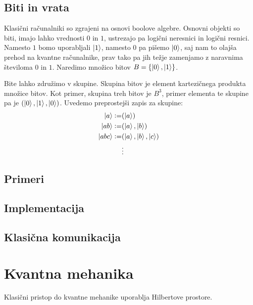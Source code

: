 \documentclass[mat1]{fmfdelo}
\newcommand{\defeq}{\vcentcolon=}
\begin{document}
\subsection{Biti in vrata}
Klasični računalniki so zgrajeni na osnovi boolove algebre. Osnovni objekti so biti, imajo lahko vrednosti \(0\) in \(1\), ustrezajo pa logični neresnici in logični resnici. Namesto \(1\) bomo uporabljali \(\ket{1}\), namesto \(0\) pa pišemo \(\ket{0}\), saj nam to olajša prehod na kvantne računalnike, prav tako pa jih težje zamenjamo z naravnima številoma \(0\) in \(1\). Naredimo množico bitov \(B = \{\ket0, \ket1\}\).

Bite lahko združimo v skupine. Skupina bitov je element kartezičnega produkta množice bitov. Kot primer, skupina treh bitov je \(B^3\), primer elementa te skupine pa je \((\ket0, \ket1, \ket0)\). Uvedemo preprostejši zapis za skupine: 
\begin{align*}
    \ket{a} \defeq& (\ket a)\\
    \ket{ab} \defeq& (\ket{a},\ket b)\\
    \ket{abc} \defeq& (\ket a, \ket b, \ket c)\\
    &\vdots
\end{align*}


\subsection{Primeri}
\subsection{Implementacija}
\subsection{Klasična komunikacija}
\section{Kvantna mehanika}
Klasični pristop do kvantne mehanike uporablja Hilbertove prostore.
\end{document}
